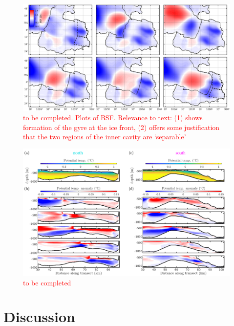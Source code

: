 \documentclass[draft]{agujournal2019}
\newcommand{\red}[1]{\textcolor{red}{#1}}
\begin{document}
\begin{figure}
    \centering
    \includegraphics[width = \textwidth]{../make_figures/plots/figure13.eps}
    \caption{\red{to be completed. Plots of BSF. Relevance to text: (1) shows formation of the gyre at the ice front, (2) offers some justification that the two regions of the inner cavity are `separable'}} 
    \label{fig:figure13}
\end{figure}

\begin{figure}
    \centering
    \includegraphics[width = \textwidth]{../make_figures/plots/figure14-labelled.pdf}
    \caption{\red{to be completed}} 
    \label{fig:figure14}
\end{figure}
\section{Discussion}\label{S:Discussion}
\end{document}
